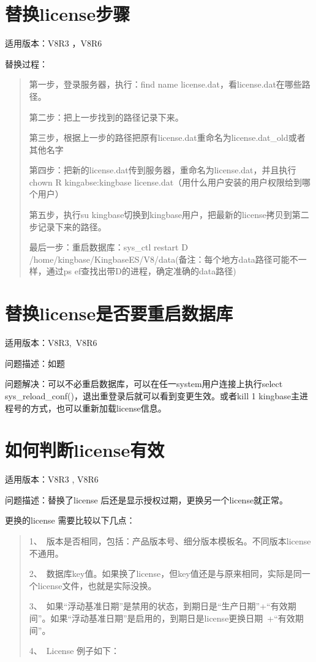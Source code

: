 \documentclass[a4,10pt,oneside,english]{sphinxmanual}
\let\sphinxpxdimen\pdfpxdimen\else\newdimen\sphinxpxdimen
\begin{document}
\section{替换license步骤}
\label{\detokenize{license:id4}}
适用版本：V8R3 ，V8R6

替换过程：
\begin{quote}

第一步，登录服务器，执行：find \sphinxhyphen{}name license.dat，看license.dat在哪些路径。

第二步：把上一步找到的路径记录下来。

第三步，根据上一步的路径把原有license.dat重命名为license.dat\_old或者其他名字

第四步：把新的license.dat传到服务器，重命名为license.dat，并且执行chown \sphinxhyphen{}R kingabse:kingbase license.dat（用什么用户安装的用户权限给到哪个用户）

第五步，执行su \sphinxhyphen{}kingbase切换到kingbase用户，把最新的license拷贝到第二步记录下来的路径。

最后一步：重启数据库：sys\_ctl restart \sphinxhyphen{}D /home/kingbase/KingbaseES/V8/data(备注：每个地方data路径可能不一样，通过ps \sphinxhyphen{}ef查找出带\sphinxhyphen{}D的进程，确定准确的data路径)
\end{quote}


\section{替换license是否要重启数据库}
\label{\detokenize{license:id5}}
适用版本：V8R3, V8R6

问题描述：如题

问题解决：可以不必重启数据库，可以在任一system用户连接上执行select sys\_reload\_conf()，退出重登录后就可以看到变更生效。或者kill \sphinxhyphen{}1 kingbase主进程号的方式，也可以重新加载license信息。


\section{如何判断license有效}
\label{\detokenize{license:id6}}
适用版本：V8R3 , V8R6

问题描述：替换了license 后还是显示授权过期，更换另一个license就正常。

更换的license 需要比较以下几点：
\begin{quote}

1、 版本是否相同，包括：产品版本号、细分版本模板名。不同版本license不通用。

2、 数据库key值。如果换了license，但key值还是与原来相同，实际是同一个license文件，也就是实际没换。

3、 如果“浮动基准日期”是禁用的状态，到期日是“生产日期”+“有效期间”。如果“浮动基准日期”是启用的，到期日是license更换日期 +“有效期间”。

4、 License 例子如下：

\begin{figure}[H]
\centering

\noindent\sphinxincludegraphics[width=556\sphinxpxdimen,height=518\sphinxpxdimen]{{FAQ24011}.png}
\end{figure}
\end{quote}
\end{document}
